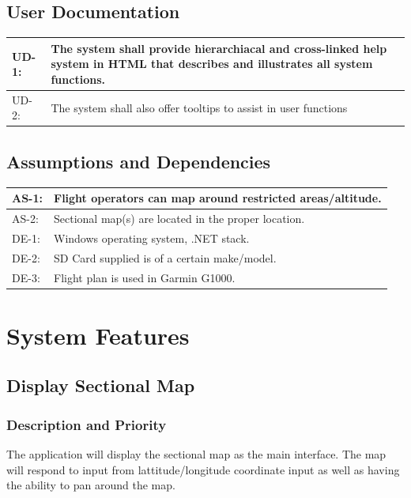 \documentclass[12pt, letterpaper]{article}
\begin{document}
  \subsection{User Documentation}
    \begin{tabularx}{\textwidth}{|l|X|} \hline
      UD-1: & The system shall provide hierarchiacal and cross-linked help system in HTML that
              describes and illustrates all system functions.\\ \hline
      UD-2: & The system shall also offer tooltips to assist in user functions \\ \hline
    \end{tabularx}
  \subsection{Assumptions and Dependencies}
    \begin{tabularx}{\textwidth}{|l|X|} \hline
      AS-1: & Flight operators can map around restricted areas/altitude. \\ \hline
      AS-2: & Sectional map(s) are located in the proper location. \\ \hline
      DE-1: & Windows operating system, .NET stack. \\ \hline
      DE-2: & SD Card supplied is of a certain make/model. \\ \hline
      DE-3: & Flight plan is used in Garmin G1000. \\ \hline
    \end{tabularx}

    \newpage
\section{System Features}
  \subsection{Display Sectional Map}
    \subsubsection{Description and Priority}
      The application will display the sectional map as the main interface.
      The map will respond to input from lattitude/longitude coordinate input as well
      as having the ability to pan around the map.
\end{document}
